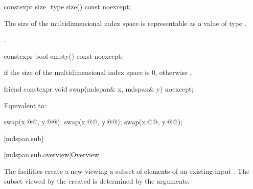 %
\begin{itemdecl}
constexpr size_type size() const noexcept;
\end{itemdecl}

\begin{itemdescr}
\pnum
\expects
The size of the multidimensional index space 
is representable as a value of type .

\pnum
\returns
{}.
\end{itemdescr}

%
\begin{itemdecl}
constexpr bool empty() const noexcept;
\end{itemdecl}

\begin{itemdescr}
\pnum
\returns
{}
if the size of the multidimensional index space  is 0,
otherwise .
\end{itemdescr}

%
\begin{itemdecl}
friend constexpr void swap(mdspan& x, mdspan& y) noexcept;
\end{itemdecl}

\begin{itemdescr}
\pnum
\effects
Equivalent to:
\begin{codeblock}
swap(x.@@, y.@@);
swap(x.@@, y.@@);
swap(x.@@, y.@@);
\end{codeblock}
\end{itemdescr}

[mdspan.sub]{}

[mdspan.sub.overview]{Overview}

\pnum
The  facilities create a new 
viewing a subset of elements of an existing input .
The subset viewed by the created  is determined by
the  arguments.

